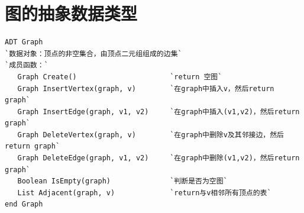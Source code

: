 \documentclass[10pt]{article}
\newcommand{\blue}{\textcolor{blue}}
\newcommand{\red}{\textcolor{red}}
\begin{document}
% 
%
%
%

\section{图的抽象数据类型}
\begin{lstlisting}[frame=tb]
ADT Graph
`数据对象：顶点的非空集合，由顶点二元组组成的边集`
`成员函数：`
   Graph Create()                      `return 空图`
   Graph InsertVertex(graph, v)        `在graph中插入v，然后return graph`
   Graph InsertEdge(graph, v1, v2)     `在graph中插入(v1,v2)，然后return graph`
   Graph DeleteVertex(graph, v)        `在graph中删除v及其邻接边，然后return graph`
   Graph DeleteEdge(graph, v1, v2)     `在graph中删除(v1,v2)，然后return graph`
   Boolean IsEmpty(graph)              `判断是否为空图`
   List Adjacent(graph, v)             `return与v相邻所有顶点的表`
end Graph
\end{lstlisting}
\end{document}
